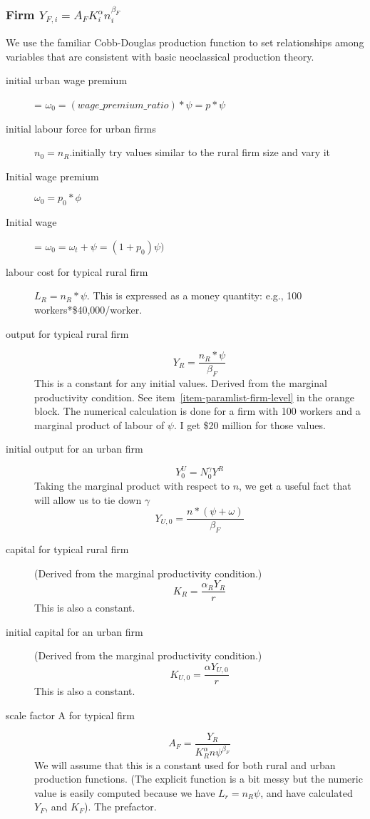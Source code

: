 \subsubsection{Firm $Y_{F,i}=A_FK_i^\alpha n_i^{\beta_F}$}
We use the familiar Cobb-Douglas production function \cite{chiangFundamentalMethodsMathematical2002} to set relationships among variables that are consistent with basic neoclassical production theory. 
\begin{description}

\item[initial urban wage premium] = $\omega_0 = (wage\_premium\_ratio) * \psi = p*\psi $

\item[initial labour force for urban firms] $n_0=n_R$.initially try values similar to the rural firm size and vary it  %
\item[Initial wage premium] $\omega_0=p_0*\phi$
\item[Initial wage] = $\omega_0=\omega_t +\psi =(1+p_0)\psi)$

\item[labour cost for typical rural firm] $L_R = n_R*\psi$. This is expressed as a money quantity: e.g., 100 workers*\$40,000/worker.  


\item[output for typical rural firm]  
\[Y_R=\frac{n_R*\psi}{\beta_F}\]
This is a constant for any initial values. Derived from the marginal productivity condition. See item~\ref{item-paramlist-firm-level} in the orange  block. The numerical calculation is done  for a firm with 100 workers and a marginal product of labour of $\psi$. I get \$20 million for those values. 


\item[initial output for an urban firm] 
\[Y_0^U=N_0^\gamma Y^R\]  
Taking the marginal product with respect to $n$, we get a useful fact that will allow us to tie down $\gamma$
\[Y_{U,0}=\frac{n*(\psi+\omega)}{\beta_F}\]

\item[capital for typical rural firm] (Derived from the marginal productivity condition.)
\[K_R=  \frac{\alpha_R Y_R }{r}\]
This is also a constant.
 
\item[initial capital for an urban firm] (Derived from the marginal productivity condition.)
\[K_{U,0}=  \frac{\alpha Y_{U,0} }{r}\]
This is also a constant.

\item[scale factor A for typical  firm] 
\[A_F= \frac{Y_R}{K_R^{\alpha} {n\psi}^{\beta_F}}\]
We will assume that this is a constant used for both rural and urban production functions. (The explicit function is a bit  messy but the numeric value is easily computed because we have $L_r=n_R\psi$, and have calculated $Y_F$, and  $K_F$). The prefactor.

\end{description}

